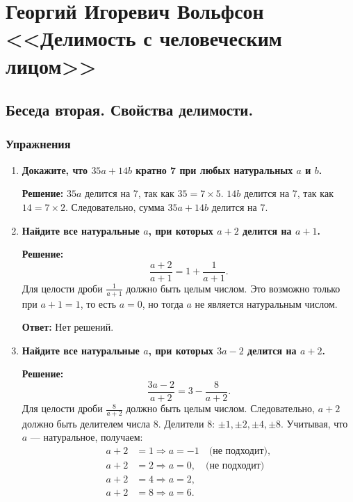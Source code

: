 \documentclass[12pt, a4paper]{article}
\begin{document}
\section*{Георгий Игоревич Вольфсон <<Делимость с человеческим лицом>>}

\subsection*{Беседа вторая. Свойства делимости.}

\subsubsection*{Упражнения}

\begin{enumerate}[label=\arabic*., wide=0pt, leftmargin=*]

\item \textbf{Докажите, что $35a + 14b$ кратно 7 при любых натуральных $a$ и $b$.}

\textbf{Решение:} 
$35a$ делится на 7, так как $35 = 7 \times 5$. 
$14b$ делится на 7, так как $14 = 7 \times 2$. 
Следовательно, сумма $35a + 14b$ делится на 7.

\item \textbf{Найдите все натуральные $a$, при которых $a + 2$ делится на $a + 1$.}

\textbf{Решение:}
\[
\frac{a + 2}{a + 1} = 1 + \frac{1}{a + 1}.
\]
Для целости дроби $\frac{1}{a + 1}$ должно быть целым числом. Это возможно только при $a + 1 = 1$, то есть $a = 0$, но тогда $a$ не является натуральным числом.

\textbf{Ответ: } Нет решений.

\item \textbf{Найдите все натуральные $a$, при которых $3a - 2$ делится на $a + 2$.}

\textbf{Решение:}
\[
\frac{3a - 2}{a + 2} = 3 - \frac{8}{a + 2}.
\]
Для целости дроби $\frac{8}{a + 2}$ должно быть целым числом. Следовательно, $a + 2$ должно быть делителем числа 8. Делители 8: $\pm1, \pm2, \pm4, \pm8$. Учитывая, что $a$ — натуральное, получаем:
\begin{align*}
a + 2 &= 1 \Rightarrow a = -1 \quad \text{(не подходит)}, \\
a + 2 &= 2 \Rightarrow a = 0, \quad \text{(не подходит)}\\
a + 2 &= 4 \Rightarrow a = 2, \\
a + 2 &= 8 \Rightarrow a = 6.
\end{align*}


\end{enumerate}
\end{document}

